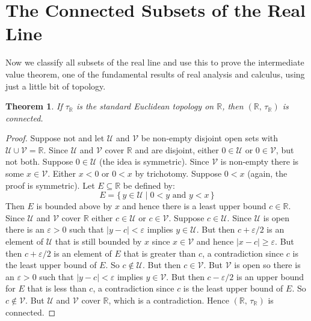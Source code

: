 \documentclass{article}
\theoremstyle{plain}
\newtheorem{theorem}{Theorem}[section]
\theoremstyle{normal}
\begin{document}
    \section{The Connected Subsets of the Real Line}
        Now we classify all subsets of the real line and use this to prove
        the intermediate value theorem, one of the fundamental results of
        real analysis and calculus, using just a little bit of topology.
        \begin{theorem}
            If $\tau_{\mathbb{R}}$ is the standard Euclidean topology on
            $\mathbb{R}$, then $(\mathbb{R},\,\tau_{\mathbb{R}})$ is connected.
        \end{theorem}
        \begin{proof}
            Suppose not and let $\mathcal{U}$ and $\mathcal{V}$ be non-empty
            disjoint open sets with $\mathcal{U}\cup\mathcal{V}=\mathbb{R}$.
            Since $\mathcal{U}$ and $\mathcal{V}$ cover $\mathbb{R}$ and are
            disjoint, either $0\in\mathcal{U}$ or $0\in\mathcal{V}$, but not
            both. Suppose
            $0\in\mathcal{U}$ (the idea is symmetric). Since $\mathcal{V}$ is
            non-empty there is some $x\in\mathcal{V}$. Either $x<0$ or
            $0<x$ by trichotomy. Suppose $0<x$ (again, the proof is symmetric).
            Let $E\subseteq\mathbb{R}$ be defined by:
            \begin{equation}
                E=\{\,y\in\mathcal{U}\;|\;0<y\textrm{ and }y<x\,\}
            \end{equation}
            Then $E$ is bounded above by $x$ and hence there is a least
            upper bound $c\in\mathbb{R}$. Since $\mathcal{U}$ and $\mathcal{V}$
            cover $\mathbb{R}$ either $c\in\mathcal{U}$ or $c\in\mathcal{V}$.
            Suppose $c\in\mathcal{U}$. Since $\mathcal{U}$ is open there is an
            $\varepsilon>0$ such that $|y-c|<\varepsilon$ implies
            $y\in\mathcal{U}$. But then $c+\varepsilon/2$ is an element of
            $\mathcal{U}$ that is still bounded by $x$ since $x\in\mathcal{V}$
            and hence $|x-c|\geq\varepsilon$. But then $c+\varepsilon/2$ is an
            element of $E$ that is greater than $c$, a contradiction since $c$
            is the least upper bound of $E$. So $c\notin\mathcal{U}$. But then
            $c\in\mathcal{V}$. But $\mathcal{V}$ is open so there is an
            $\varepsilon>0$ such that $|y-c|<\varepsilon$ implies
            $y\in\mathcal{V}$. But then $c-\varepsilon/2$ is an upper bound for
            $E$ that is less than $c$, a contradiction since $c$ is the least
            upper bound of $E$. So $c\notin\mathcal{V}$. But $\mathcal{U}$ and
            $\mathcal{V}$ cover $\mathbb{R}$, which is a contradiction. Hence
            $(\mathbb{R},\,\tau_{\mathbb{R}})$ is connected.
         \end{proof}
\end{document}

